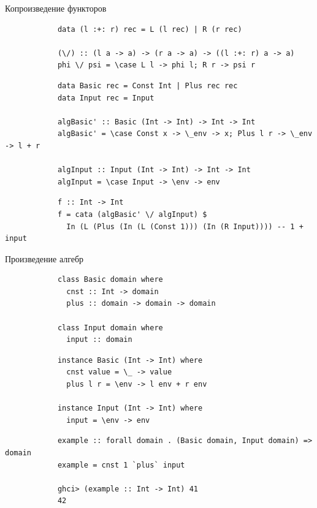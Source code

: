     \begin{frame}[fragile]{Копроизведение функторов}
        \pause
        \begin{verbatim}
            data (l :+: r) rec = L (l rec) | R (r rec)

            (\/) :: (l a -> a) -> (r a -> a) -> ((l :+: r) a -> a)
            phi \/ psi = \case L l -> phi l; R r -> psi r
        \end{verbatim}
        \pause\vspace{1em}
        \begin{verbatim}
            data Basic rec = Const Int | Plus rec rec
            data Input rec = Input

            algBasic' :: Basic (Int -> Int) -> Int -> Int
            algBasic' = \case Const x -> \_env -> x; Plus l r -> \_env -> l + r

            algInput :: Input (Int -> Int) -> Int -> Int
            algInput = \case Input -> \env -> env
        \end{verbatim}
        \pause\vspace{1em}
        \begin{verbatim}
            f :: Int -> Int
            f = cata (algBasic' \/ algInput) $
              In (L (Plus (In (L (Const 1))) (In (R Input)))) -- 1 + input
        \end{verbatim}
    \end{frame}

    \begin{frame}[fragile]{Произведение алгебр}
        \pause
        \vspace{-1em}
        \begin{verbatim}
            class Basic domain where
              cnst :: Int -> domain
              plus :: domain -> domain -> domain

            class Input domain where
              input :: domain
        \end{verbatim}
        \pause\vspace{1em}
        \begin{verbatim}
            instance Basic (Int -> Int) where
              cnst value = \_ -> value
              plus l r = \env -> l env + r env

            instance Input (Int -> Int) where
              input = \env -> env
        \end{verbatim}
        \pause\vspace{1em}
        \begin{verbatim}
            example :: forall domain . (Basic domain, Input domain) => domain
            example = cnst 1 `plus` input

            ghci> (example :: Int -> Int) 41
            42
        \end{verbatim}
    \end{frame}


